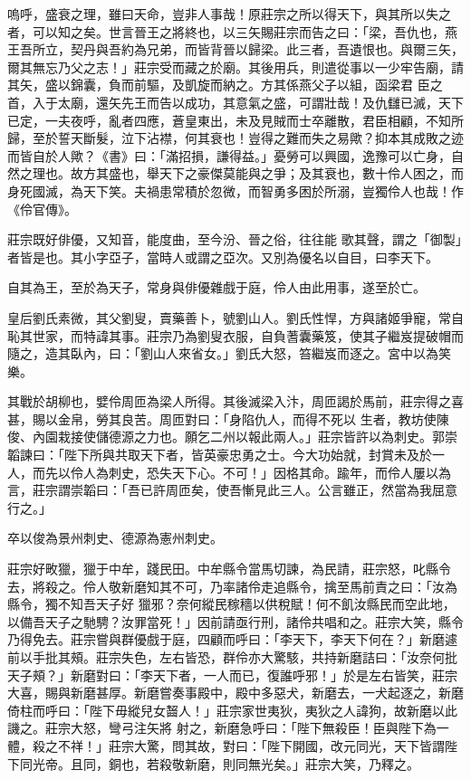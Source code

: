
\begin{pinyinscope}

 嗚呼，盛衰之理，雖曰天命，豈非人事哉！原莊宗之所以得天下，與其所以失之者，可以知之矣。世言晉王之將終也，以三矢賜莊宗而告之曰：「梁，吾仇也，燕王吾所立，契丹與吾約為兄弟，而皆背晉以歸梁。此三者，吾遺恨也。與爾三矢，爾其無忘乃父之志！」莊宗受而藏之於廟。其後用兵，則遣從事以一少牢告廟，請其矢，盛以錦囊，負而前驅，及凱旋而納之。方其係燕父子以組，函梁君
 臣之首，入于太廟，還矢先王而告以成功，其意氣之盛，可謂壯哉！及仇讎已滅，天下已定，一夫夜呼，亂者四應，蒼皇東出，未及見賊而士卒離散，君臣相顧，不知所歸，至於誓天斷髮，泣下沾襟，何其衰也！豈得之難而失之易歟？抑本其成敗之迹而皆自於人歟？《書》曰：「滿招損，謙得益。」憂勞可以興國，逸豫可以亡身，自然之理也。故方其盛也，舉天下之豪傑莫能與之爭；及其衰也，數十伶人困之，而身死國滅，為天下笑。夫禍患常積於忽微，而智勇多困於所溺，豈獨伶人也哉！作《伶官傳》。



 莊宗既好俳優，又知音，能度曲，至今汾、晉之俗，往往能
 歌其聲，謂之「御製」者皆是也。其小字亞子，當時人或謂之亞次。又別為優名以自目，曰李天下。



 自其為王，至於為天子，常身與俳優雜戲于庭，伶人由此用事，遂至於亡。



 皇后劉氏素微，其父劉叟，賣藥善卜，號劉山人。劉氏性悍，方與諸姬爭寵，常自恥其世家，而特諱其事。莊宗乃為劉叟衣服，自負蓍囊藥笈，使其子繼岌提破帽而隨之，造其臥內，曰：「劉山人來省女。」劉氏大怒，笞繼岌而逐之。宮中以為笑樂。



 其戰於胡柳也，嬖伶周匝為梁人所得。其後滅梁入汴，周匝謁於馬前，莊宗得之喜甚，賜以金帛，勞其良苦。周匝對曰：「身陷仇人，而得不死以
 生者，教坊使陳俊、內園栽接使儲德源之力也。願乞二州以報此兩人。」莊宗皆許以為刺史。郭崇韜諫曰：「陛下所與共取天下者，皆英豪忠勇之士。今大功始就，封賞未及於一人，而先以伶人為刺史，恐失天下心。不可！」因格其命。踰年，而伶人屢以為言，莊宗謂崇韜曰：「吾已許周匝矣，使吾慚見此三人。公言雖正，然當為我屈意行之。」



 卒以俊為景州刺史、德源為憲州刺史。



 莊宗好畋獵，獵于中牟，踐民田。中牟縣令當馬切諫，為民請，莊宗怒，叱縣令去，將殺之。伶人敬新磨知其不可，乃率諸伶走追縣令，擒至馬前責之曰：「汝為縣令，獨不知吾天子好
 獵邪？奈何縱民稼穡以供稅賦！何不飢汝縣民而空此地，以備吾天子之馳騁？汝罪當死！」因前請亟行刑，諸伶共唱和之。莊宗大笑，縣令乃得免去。莊宗嘗與群優戲于庭，四顧而呼曰：「李天下，李天下何在？」新磨遽前以手批其頰。莊宗失色，左右皆恐，群伶亦大驚駭，共持新磨詰曰：「汝奈何批天子頰？」新磨對曰：「李天下者，一人而已，復誰呼邪！」於是左右皆笑，莊宗大喜，賜與新磨甚厚。新磨嘗奏事殿中，殿中多惡犬，新磨去，一犬起逐之，新磨倚柱而呼曰：「陛下毋縱兒女齧人！」莊宗家世夷狄，夷狄之人諱狗，故新磨以此譏之。莊宗大怒，彎弓注矢將
 射之，新磨急呼曰：「陛下無殺臣！臣與陛下為一體，殺之不祥！」莊宗大驚，問其故，對曰：「陛下開國，改元同光，天下皆謂陛下同光帝。且同，銅也，若殺敬新磨，則同無光矣。」莊宗大笑，乃釋之。




\end{pinyinscope}

